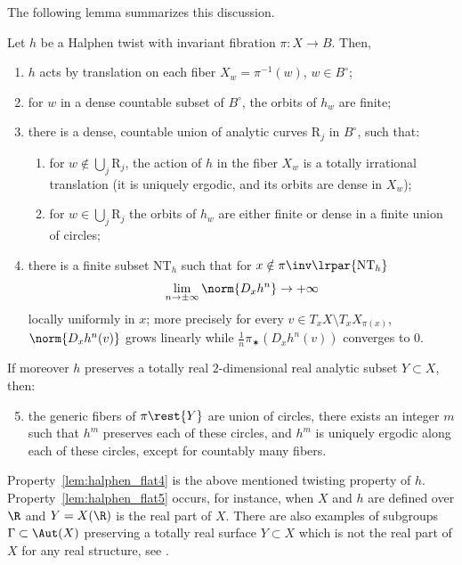 The following lemma summarizes this discussion.

\begin{lem}\label{lem:halphen_flat} Let $h$ be a Halphen twist with invariant fibration
$\pi:X\to B$. Then,
\begin{enumerate}
\item\label{lem:halphen_flat1} $h$ acts by translation on each fiber $X_w=\pi^{-1}(w)$, $w \in B^\circ$;
\item\label{lem:halphen_flat2} for $w$ in a dense countable subset of $B^\circ$, the orbits of $h_w$ are finite;
\item\label{lem:halphen_flat3} there is a dense, countable union of analytic curves $\mathrm R_j$ in $B^\circ$,
such that:
\begin{enumerate}
\item\label{lem:halphen_flat3a} for $w\notin\bigcup_j \mathrm R_j$, the action of $h$ in the fiber $X_w$ is a totally irrational
translation (it is uniquely ergodic, and its orbits are dense in $X_w$);
\item\label{lem:halphen_flat3b} for $w\in \bigcup_j \mathrm R_j$ the orbits of $h_w$ are either finite or dense in a finite union of circles;
\end{enumerate}
\item\label{lem:halphen_flat4} there is a finite subset $\mathrm{NT}_h$ such that for $x\notin \pi\inv\lrpar{
\mathrm{NT}_h}$
\[
\lim_{n\to \pm \infty} \norm{D_xh^n}\to +\infty
\]
locally uniformly in $x$; more precisely for every
$v\in T_xX \setminus T_x X_{\pi(x)}$, $\norm{D_x h^{n}(v)}$ grows linearly while
$\frac{1}{n}\pi_\varstar (D_xh^{n}(v))$ converges to $0$.
\end{enumerate}
If moreover $h$ preserves a totally real $2$-dimensional real analytic subset $Y\subset X$, then:
\begin{enumerate}\setcounter{enumi}{4}
\item\label{lem:halphen_flat5} the generic fibers of $\pi\rest{Y}$ are union of circles,
there exists an integer $m$ such that $h^m$ preserves each of these circles, and $h^m$ is uniquely ergodic along each of these circles,
except for countably many fibers.
\end{enumerate}
\end{lem}

Property~\eqref{lem:halphen_flat4} is the above mentioned twisting property of $h$. Property~\eqref{lem:halphen_flat5} occurs, for instance, when $X$ and $h$ are defined over $\R$
and $Y=X(\R)$ is the real part of $X$. There are also examples of
subgroups $\Gamma\subset \Aut(X)$ preserving a totally real surface $Y\subset X$ which is not the real part of $X$ for any real structure, see \cite[\S 9]{invariant}.

